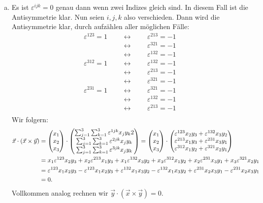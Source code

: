 \documentclass{theozettel}
\renewcommand{\epsilon}{\varepsilon}
\begin{document}
\begin{enumerate}[(a)]
	\item 	Es ist $\epsilon^{ijk} = 0$ genau dann wenn zwei Indizes gleich sind. In diesem Fall ist die Antisymmetrie klar. Nun seien $i,j,k$ also verschieden. Dann wird die Antisymmetrie klar, durch aufzählen aller möglichen Fälle:
			\begin{align*}
				\epsilon^{123} = 1 &&& \longleftrightarrow &&& \epsilon^{213} = -1 \\
				&&& \longleftrightarrow &&& \epsilon^{321} = -1 \\
				&&& \longleftrightarrow &&& \epsilon^{132} = -1 \\
				\epsilon^{312} = 1 &&& \longleftrightarrow &&& \epsilon^{132} = -1 \\
				&&& \longleftrightarrow &&& \epsilon^{213} = -1 \\
				&&& \longleftrightarrow &&& \epsilon^{321} = -1 \\
				\epsilon^{231} = 1 &&& \longleftrightarrow &&& \epsilon^{321} = -1 \\
				&&& \longleftrightarrow &&& \epsilon^{132} = -1 \\
				&&& \longleftrightarrow &&& \epsilon^{213} = -1 \\
			\end{align*}
			Wir folgern:
			\begin{align*}
				\vec{x} \cdot (\vec{x} \times \vec{y}) &= \mqty(x_{1} \\ x_{2} \\ x_{3}) \cdot \mqty( \sum_{j=1}^{3}\sum_{k=1}^{3} \epsilon^{1jk}x_{j}y_{k}2 \\ \sum_{j=1}^{3}\sum_{k=1}^{3} \epsilon^{2jk}x_{j}y_{k} \\ \sum_{j=1}^{3}\sum_{k=1}^{3} \epsilon^{3jk}x_{j}y_{k}) = \mqty(x_{1} \\ x_{2} \\ x_{3}) \cdot \mqty( \epsilon^{123}x_{2}y_{3} + \epsilon^{132}x_{3}y_{2} \\ \epsilon^{213}x_{1}y_{3} + \epsilon^{231}x_{3}y_{1} \\ \epsilon^{312}x_{1}y_{2} + \epsilon^{321}x_{2}y_{1} ) \\		
				&= x_{1}\epsilon^{123}x_{2}y_{3} +x_{2}\epsilon^{213}x_{1}y_{3} + x_{1}\epsilon^{132}x_{3}y_{2} + x_{3}\epsilon^{312}x_{1}y_{2} + x_{2}\epsilon^{231}x_{3}y_{1} + x_{3}\epsilon^{321}x_{2}y_{1} \\
				&= 	\epsilon^{123}x_{1}x_{2}y_{3} - \epsilon^{123}x_{1}x_{2}y_{3} + \epsilon^{132}x_{1}x_{3}y_{2} -\epsilon^{132}x_{1}x_{3}y_{2} + \epsilon^{231}x_{2}x_{3}y_{1} - \epsilon^{231}x_{2}x_{3}y_{1} \\ &= 0.
			\end{align*}
			Vollkommen analog rechnen wir $\vec{y} \cdot (\vec{x} \times \vec{y}) = 0$. 
\end{enumerate}
\end{document}
